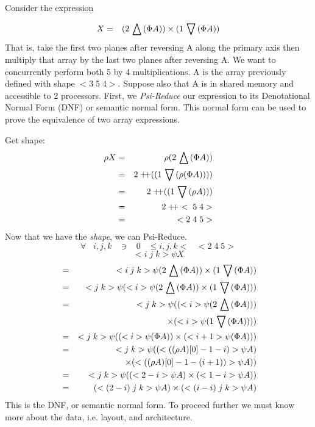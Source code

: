 
Consider the expression

\begin{eqnarray}
X & = & (2 \,\bigtriangleup\, ( \Phi A)) \times ( 1 \,\bigtriangledown\, (\Phi A)) 
\end{eqnarray}
That is, take the first two planes after reversing A along the primary axis then multiply that array by the last two 
planes after reversing A. We want to concurrently perform both 5 by 4 multiplications. 
A is the array previously defined with shape $<3\;5\;4>$.
Suppose also that A is in shared memory and accessible to 2 processors.
First, we {\em Psi-Reduce} our expression to its Denotational Normal Form (DNF) or semantic 
normal form. This normal form can be used to prove the equivalence of  two array expressions.

Get shape: 
\begin{eqnarray}
\rho X & = & \rho (2 \take (\Phi A)) \nonumber \\
& = & 2 \cat ((1\drop (\rho ( \Phi A)))) \nonumber \\
&=& 2 \cat ((1 \drop (\rho  A))) \nonumber \\
&=& 2 \cat <\;5\;4> \nonumber \\
&=& <2\;4\;5>
\end{eqnarray}
Now that we have the {\em shape}, we can {Psi-Reduce}.
\[ \forall \;\;\; i,j,k \;\;\; \ni \;\;\; 0 \;\;\;\leq i,j,k < \;\;\;<2\;4\;5> \]
\[<i\;j\;k> \psi X \]
\begin{eqnarray}
& =&<i\;j\;k> \psi (2 \,\bigtriangleup\, ( \Phi A)) \times ( 1 \,\bigtriangledown\, (\Phi A)) \nonumber \\
&=&<j\;k> \psi (<i> \psi (2 \,\bigtriangleup\, ( \Phi A)) \times ( 1 \,\bigtriangledown\, (\Phi A)) )\nonumber \\
&= &<j\;k> \psi ((<i> \psi ( 2 \,\bigtriangleup\, (\Phi A))) \nonumber \\
&&\;\;\;\;\;\times ( <i> \psi ( 1 \,\bigtriangledown\, (\Phi A)))) \nonumber \\
&= &<j\;k> \psi (( <i> \psi (\Phi A)) \times (<i+1> \psi (\Phi A))) \nonumber \\
&=&<j\;k> \psi ((<((\rho A)[0] - 1 - i)> \psi A ) \nonumber \\
&& \;\;\;\;\;\times  (<((\rho A)[0] - 1 -( i + 1))> \psi A ) )\nonumber \\
&=&<j\;k> \psi ((< 2-i> \psi A ) \times (<1-i>  \psi A) ) \nonumber \\
&=& (< (2-i)\; j\;k> \psi A )  \times (<(i-i) \; j\;k> \psi A ) 
 \end{eqnarray}
\normalsize
This is the DNF, or semantic normal form. To proceed further we must know more about the data, i.e. layout, and architecture. 
